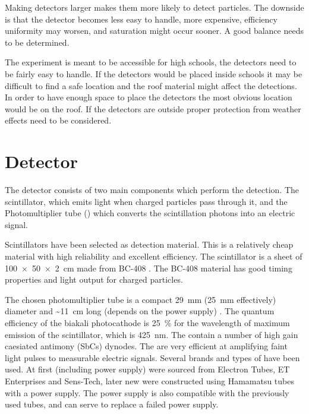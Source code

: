 Making detectors larger makes them more likely to detect particles. The downside is that the detector becomes less easy to handle, more expensive, efficiency uniformity may worsen, and saturation might occur sooner. A good balance needs to be determined.

The experiment is meant to be accessible for high schools, the detectors need to be fairly easy to handle. If the detectors would be placed inside schools it may be difficult to find a safe location and the roof material might affect the detections. In order to have enough space to place the detectors the most obvious location would be on the roof. If the detectors are outside proper protection from weather effects need to be considered.


\section{Detector}

The detector consists of two main components which perform the detection. The scintillator, which emits light when charged particles pass through it, and the Photomultiplier tube (\pmt) which converts the scintillation photons into an electric signal.

Scintillators have been selected as detection material. This is a relatively cheap material with high reliability and excellent efficiency. The scintillator is a sheet of \SI[product-units=power]{100 x 50 x 2}{\centi\meter} made from BC-408 \cite{bc408}. The BC-408 material has good timing properties and light output for charged particles.

The chosen photomultiplier tube \cite{et:pmt} is a compact \SI{29}{\milli\meter} (\SI{25}{\milli\meter} effectively) diameter and \SI{~11}{\centi\meter} long (depends on the power supply) \pmt. The quantum efficiency of the biakali photocathode is \SI{25}{\percent} for the wavelength of maximum emission of the scintillator, which is \SI{425}{\nano\meter}. The \pmts contain a number of high gain caesiated antimony (SbCs) dynodes. The \pmts are very efficient at amplifying faint light pulses to measurable electric signals. Several brands and types of \pmts have been used. At first \pmts (including power supply) were sourced from Electron Tubes, ET Enterprises and Sens-Tech, later new \pmts were constructed using Hamamatsu tubes with a \nikhef power supply. The \nikhef power supply is also compatible with the previously used tubes, and can serve to replace a failed power supply.

